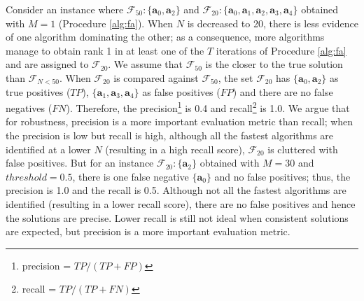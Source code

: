 \documentclass[conference]{IEEEtran}
\begin{document}
Consider an instance where $\mathcal{F}_{50}:\{\mathbf{a}_0,\mathbf{a}_2\}$ and $\mathcal{F}_{20}:\{\mathbf{a}_0,\mathbf{a}_1,\mathbf{a}_2,\mathbf{a}_3,\mathbf{a}_4\}$ obtained with $M=1$ (Procedure \ref{alg:fa}). When $N$ is decreased to 20, there is less evidence of one algorithm dominating the other; as a consequence, more algorithms manage to obtain rank 1 in at least one of the $T$ iterations of Procedure \ref{alg:fa} and are assigned to $\mathcal{F}_{20}$.  We assume that $\mathcal{F}_{50}$ is the closer to the true solution than $\mathcal{F}_{N<50}$. When $\mathcal{F}_{20}$ is compared against $\mathcal{F}_{50}$, the set $\mathcal{F}_{20}$ has  $\{\mathbf{a}_0,\mathbf{a}_2\}$ as true positives ($TP$), $\{\mathbf{a}_1,\mathbf{a}_3,\mathbf{a}_4\}$  as false positives ($FP$) and there are no false negatives ($FN$). Therefore, the precision\footnote{precision = $TP/(TP+FP)$} is 0.4 and recall\footnote{recall = $TP/(TP+FN)$} is 1.0. We argue that for robustness, precision is a more important evaluation metric than recall; when the precision is low but recall is high, although all the fastest algorithms are identified at a lower $N$ (resulting in a high recall score), $\mathcal{F}_{20}$ is cluttered with false positives. But for an instance $\mathcal{F}_{20} : \{\mathbf{a}_2\}$ obtained with $M=30$ and $threshold=0.5$, there is one false negative $\{\mathbf{a}_0\}$ and no false positives; thus, the precision is 1.0 and the recall is 0.5. Although not all the fastest algorithms are identified (resulting in a lower recall score), there are no false positives and hence the solutions are precise. Lower recall is still not ideal when consistent solutions are expected, but precision is a more important evaluation metric. 
\end{document}
